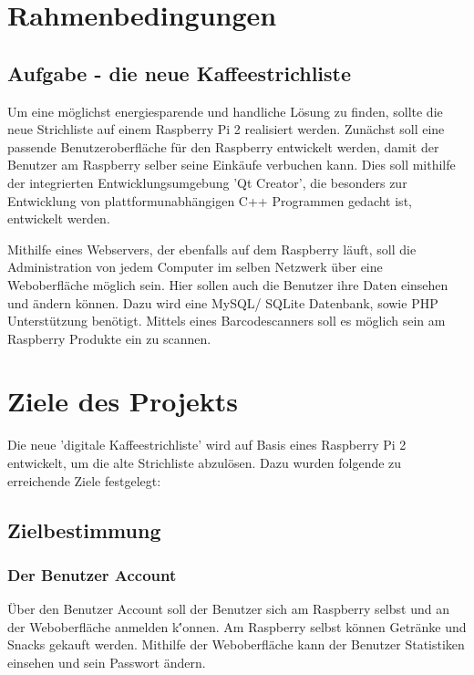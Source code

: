 \documentclass[11pt,a4paper]{article} %
\begin{document}

\section{Rahmenbedingungen}


\subsection{Aufgabe - die neue Kaffeestrichliste}
\label{SchriftAnpassen}

Um eine m\"oglichst energiesparende und handliche L\"osung zu finden, sollte die neue Strichliste auf einem Raspberry Pi 2 realisiert werden. Zun\"achst soll eine passende Benutzeroberfl\"ache f\"ur den Raspberry entwickelt werden, damit der Benutzer am Raspberry selber seine Eink\"aufe verbuchen kann. Dies soll mithilfe der integrierten Entwicklungsumgebung 'Qt Creator', die besonders zur Entwicklung von plattformunabh\"angigen C++ Programmen gedacht ist, entwickelt werden.
\par
Mithilfe eines Webservers, der ebenfalls auf dem Raspberry l\"auft, soll die Administration von jedem Computer im selben Netzwerk \"uber eine Weboberfl\"ache m\"oglich sein. Hier sollen auch die Benutzer ihre Daten einsehen und \"andern k\"onnen. Dazu wird eine MySQL/ SQLite Datenbank, sowie PHP Unterst\"utzung ben\"otigt. Mittels eines Barcodescanners soll es m\"oglich sein am Raspberry Produkte ein zu scannen.


\section{Ziele des Projekts}
Die neue 'digitale Kaffeestrichliste' wird auf Basis eines Raspberry Pi 2 entwickelt, um die alte Strichliste abzul\"osen. Dazu wurden folgende zu erreichende Ziele festgelegt:
\subsection{Zielbestimmung}
\label{Ausrichtung}

\subsubsection{Der Benutzer Account}
\"Uber den Benutzer Account soll der Benutzer sich am Raspberry selbst und an der Weboberfl\"ache anmelden k\''onnen. Am Raspberry selbst k\"onnen Getr\"anke und Snacks gekauft werden. Mithilfe der Weboberfl\"ache kann der Benutzer Statistiken einsehen und sein Passwort \"andern.
\end{document}
